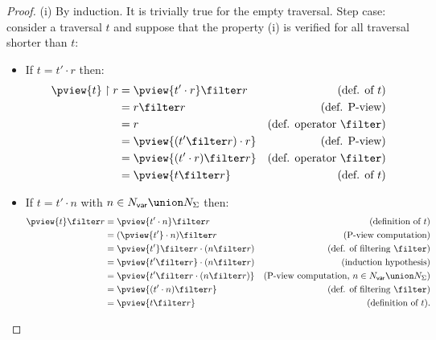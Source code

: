 \begin{proof}
(i) By induction. It is trivially true for the empty
traversal. Step case: consider a traversal $t$ and
suppose that the property (i) is verified for all traversal shorter
than $t$:
\begin{itemize}[-]
\item If $t = t' \cdot r$ then:
    \begin{align*}
    \pview{t} \upharpoonright  r
        &=  \pview{t' \cdot r } \filter  r       & (\mbox{def. of } t)\\
        &=  r \filter  r                         & (\mbox{def. P-view})\\
        &=  r                                                & (\mbox{def. operator $\filter$})\\
        &=  \pview{(t' \filter  r ) \cdot r }    & (\mbox{def. P-view})\\
        &=  \pview{(t' \cdot r)  \filter  r }    & (\mbox{def. operator $\filter$})\\
        &= \pview{t \filter  r }                & (\mbox{def. of } t)
    \end{align*}
\item If $t = t' \cdot n$ with $n \in N_{\sf var} \union N_{\Sigma}$ then:
    \begin{align*}
    \pview{t} \filter  r
&= \pview{t' \cdot n} \filter  r & (\mbox{definition of } t)\\
        &= (\pview{t'} \cdot n) \filter  r  & (\mbox{P-view computation}) \\
        &= \pview{t'} \filter  r  \cdot (n \filter  r)            & (\mbox{def. of filtering $\filter$}) \\
        &= \pview{t' \filter  r } \cdot (n \filter  r)           & (\mbox{induction hypothesis}) \\
        &= \pview{t' \filter  r \cdot (n \filter  r) } & (\mbox{P-view computation, $n \in N_{\sf var} \union N_{\Sigma}$}) \\
        &= \pview{(t' \cdot n ) \filter  r  }           & (\mbox{def. of filtering $\filter$}) \\
        &= \pview{t \filter  r  }
 & (\mbox{definition of } t).
    \end{align*}



\end{itemize}
\end{proof}
